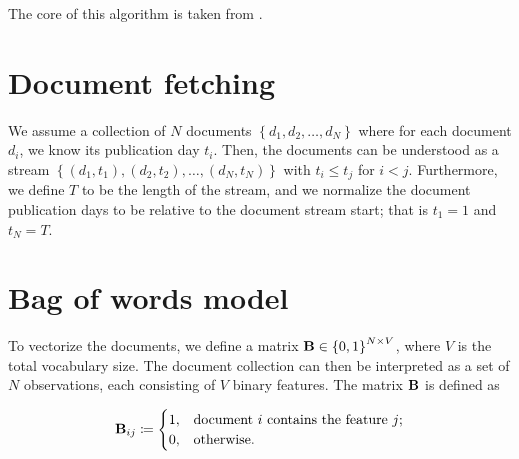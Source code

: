 

\newcommand{\doccount}{N}
\newcommand{\featcount}{V}
\newcommand{\streamlen}{T}
\newcommand{\traj}{y}
\newcommand{\df}{DF}
\newcommand{\featset}{\text{M}}

\newcommand{\docoverlap}{\text{d}}
\newcommand{\featsim}{\text{JSD}}

\newcommand{\bowmat}{\mat{B}}
\newcommand{\dtdmat}{\mat{D}}
\newcommand{\trajmat}{\mat{T}}


The core of this algorithm is taken from \cite{event-detection}.

\section{Document fetching}
We assume a collection of $N$ documents $\left\{ d_{1}, d_{2}, \dots, d_{\doccount} \right\}$ where for each document $d_{i}$, we know its publication day $t_{i}$. Then, the documents can be understood as a stream $\left\{ (d_{1}, t_{1}), (d_{2}, t_{2}), \dots, (d_{\doccount}, t_{\doccount}) \right\}$ with $t_{i} \leq t_{j}$ for $i < j$. Furthermore, we define $\streamlen$ to be the length of the stream, and we normalize the document publication days to be relative to the document stream start; that is $t_{1} = 1$ and $t_{\doccount} = \streamlen$.


\section{Bag of words model}
To vectorize the documents, we define a matrix $\bowmat \in \left\{ 0, 1 \right\}^{\doccount \times \featcount}$, where $\featcount$ is the total vocabulary size. The document collection can then be interpreted as a set of $\doccount$ observations, each consisting of $\featcount$ binary features. The matrix $\bowmat$ is defined as

\begin{equation} \label{eq:bow-matrix}
	\bowmat_{ij} \coloneqq
	\begin{cases}
		1, & \text{document}~i~\text{contains the feature}~j \text{;} \\
		0, & \text{otherwise.}
	\end{cases}
\end{equation}

